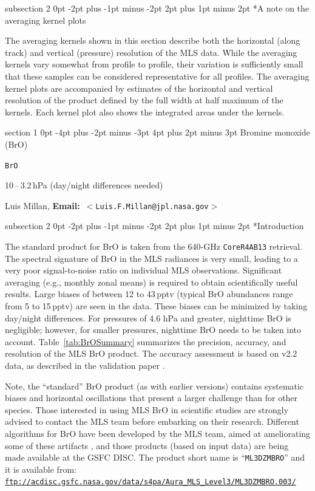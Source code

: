 \documentclass[11pt,draft]{report}
\makeatletter
\renewcommand{\section}{\@startsection%
  {section}%
  {1}%
  {0pt}%
  {-4pt plus -2pt minus -3pt}%
  {4pt plus 2pt minus 3pt}%
  {\Large\sffamily\fontseries{sb}\selectfont\flushleft\color{SectionColor}\figureversion{tabular}}}%
\renewcommand{\subsection}{\@startsection%
  {subsection}%
  {2}%
  {0pt}%
  {-2pt plus -1pt minus -2pt}%
  {2pt plus 1pt minus 2pt}%
  {\large\sffamily\fontseries{sb}\selectfont\flushleft\color{SectionColor}\figureversion{tabular}}}%
\newcommand{\speciestitle}[5][]{%
\cleardoublepage
\suppressfloats%
\thispagestyle{plain}%
{\noindent\colorbox{SectionBackground}{%
\begin{minipage}{\linewidth-2\fboxsep}%
\flushleft%
\section{#2 (#3)}%
\rhead{\large\sffamily\color{HeaderFooterColor}\nouppercase{\thesection.\
  #2 (#3)}}
\label{navSection#4}%
\label{sec:Standard#4}%
\color{SectionColor}\sffamily
\begin{description}[font=\sffamily\bfseries,topsep=0pt,partopsep=0pt]
\item[Swath name:] \texttt{#4} #1
#5
\end{description}
\end{minipage}}}%
\renewcommand{\currentnav}{#4}%
}
\newcommand{\email}[1]{\mbox{\textbf{Email:} $<$\texttt{#1}$>$}}
\newcommand{\currentnav}{BLANK}
\makeatother
\begin{document}
\subsection*{A note on the averaging kernel plots}

The averaging kernels shown in this section describe both the horizontal
(along track) and vertical (pressure) resolution of the MLS \thisv data.
While the averaging kernels vary somewhat from profile to profile, their
variation is sufficiently small that these samples can be considered
representative for all profiles.  The averaging kernel plots are
accompanied by estimates of the horizontal and vertical resolution of
the product defined by the full width at half maximum of the kernels.
Each kernel plot also shows the integrated areas under the kernels.

\speciestitle{Bromine monoxide}{BrO}{BrO}{%
\item[Useful range: ] 10\,--\,3.2\,hPa (day/night differences needed)
\item[Contact:] Luis Millan, \email{Luis.F.Millan@jpl.nasa.gov}}
\subsection*{Introduction}

The standard product for BrO is taken from the 640-GHz \texttt{CoreR4AB13}
retrieval. The spectral signature of BrO in the MLS radiances is very
small, leading to a very poor signal-to-noise ratio on individual MLS
observations.  Significant averaging (e.g., monthly zonal means) is
required to obtain scientifically useful results.  Large biases of
between 12 to 43\,pptv (typical BrO abundances range from 5 to 15\,pptv)
are seen in the data. These biases can be minimized by taking day/night
differences. For pressures of 4.6 hPa and greater, nighttime BrO is
negligible; however, for smaller pressures, nighttime BrO needs to be
taken into account. Table~\ref{tab:BrOSummary} summarizes the precision,
accuracy, and resolution of the MLS \thisv BrO product. The accuracy
assessment is based on v2.2 data, as described in the validation paper
\citep{KovalenkoEtal07}.

Note, the \thisv ``standard'' BrO product (as with earlier versions)
contains systematic biases and horizontal oscillations that present a
larger challenge than for other species.  Those interested in using MLS
BrO in scientific studies are strongly advised to contact the MLS team
before embarking on their research.  Different algorithms for BrO have
been developed by the MLS team, aimed at ameliorating some of these
artifacts \citep{MillanEtal12}, and those products (based on
\prevv input data) are being made available at the GSFC DISC\@.  The
product short name is ``\texttt{ML3DZMBRO}'' and it is available from:
\newcommand{\myus}{\rule{1ex}{0.8pt}}
\href{ftp://acdisc.gsfc.nasa.gov/data/s4pa/Aura_MLS_Level3/ML3DZMBRO.003/}%
{\texttt{ftp://acdisc.gsfc.nasa.gov/data/s4pa/Aura\_MLS\_Level3/ML3DZMBRO.003/}}
\end{document}
